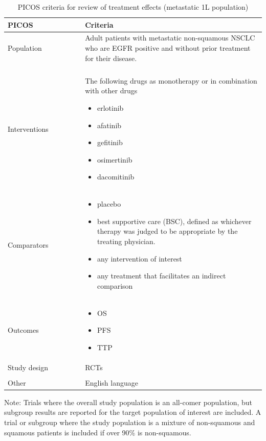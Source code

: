 \documentclass[11pt,final,fleqn]{article}\usepackage[]{graphicx}\usepackage[]{color}
\theoremstyle{plain}
\begin{document}
{\begin{appendices}
\begin{table}[!ht]
\begin{center}
\begin{threeparttable}
\caption{PICOS criteria for review of treatment effects (metastatic 1L population)} \label{tbl:picos-tx-effects-1L}
\begin{tabular}{p{0.3\linewidth}p{0.7\linewidth}}
\hline
\multicolumn{1}{l}{PICOS} &  \multicolumn{1}{l}{Criteria}\\
\hline
Population & Adult patients with metastatic non-squamous NSCLC who are EGFR positive and without prior treatment for their disease.\\
&\\
Interventions & The following drugs as monotherapy or in combination with other drugs 
\begin{itemize}
\item erlotinib
\item afatinib
\item gefitinib
\item osimertinib
\item dacomitinib
\end{itemize} \\
Comparators & 
\begin{itemize}
\item placebo
\item best supportive care (BSC), defined as whichever therapy was judged to be appropriate by the treating physician.
\item any intervention of interest
\item any treatment that facilitates an indirect comparison
\end{itemize} \\
Outcomes & 
\begin{itemize}
\item OS
\item PFS
\item TTP
\end{itemize} \\
Study design & RCTs \\
&\\
Other & English language\\
\hline
\end{tabular}
\scriptsize Note: Trials where the overall study population is an all-comer population, but subgroup results are reported for the target population of interest are included. A trial or subgroup where the study population is a mixture of non-squamous and squamous patients is included if over 90\% is non-squamous. 
\end{threeparttable}
\end{center}
\end{table}



\end{appendices}}
\end{document}

